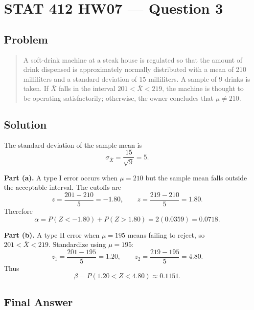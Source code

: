 \documentclass[11pt]{article}
\begin{document}
\section*{STAT 412 HW07 --- Question 3}

\subsection*{Problem}

\begin{quote}
A soft-drink machine at a steak house is regulated so that the amount of drink dispensed is approximately normally distributed with a mean of 210 milliliters and a standard deviation of 15 milliliters. A sample of 9 drinks is taken. If $\bar X$ falls in the interval $201<\bar X<219$, the machine is thought to be operating satisfactorily; otherwise, the owner concludes that $\mu\ne210$.
\end{quote}

\subsection*{Solution}

The standard deviation of the sample mean is
\[
\sigma_{\bar X}=\frac{15}{\sqrt{9}}=5.
\]

\textbf{Part (a).} A type I error occurs when $\mu=210$ but the sample mean falls outside the acceptable interval. The cutoffs are
\[
z=\frac{201-210}{5}=-1.80,\qquad z=\frac{219-210}{5}=1.80.
\]
Therefore
\[
\alpha=P(Z<-1.80)+P(Z>1.80)=2(0.0359)=0.0718.
\]

\textbf{Part (b).} A type II error when $\mu=195$ means failing to reject, so $201<\bar X<219$. Standardize using $\mu=195$:
\[
z_1=\frac{201-195}{5}=1.20,\qquad z_2=\frac{219-195}{5}=4.80.
\]
Thus
\[
\beta=P(1.20<Z<4.80)\approx 0.1151.
\]

\subsection*{Final Answer}

\end{document}
